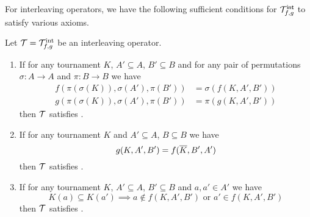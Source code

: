 For interleaving operators, we have the following sufficient conditions for
${\mathcal{T}_{f, g}^\mathsf{int}}$ to satisfy various axioms.

\begin{lemma}
   \label{tourn_result_interleaving_suffconditions}

   Let $\mathcal{T} = \mathcal{T}_{f,g}^{\text{int}}$ be an interleaving operator.

   \begin{enumerate}
       \item \label{tourn_item_int_lemma_anon}

        If for any tournament $K$, $A' \subseteq A$, $B' \subseteq B$ and for
        any pair of permutations $\sigma: A \to A$ and $\pi: B \to B$ we have
        \begin{align*}
            f(\pi(\sigma(K)), \sigma(A'), \pi(B')) &= \sigma(f(K, A', B')) \\
            g(\pi(\sigma(K)), \sigma(A'), \pi(B')) &= \pi(g(K, A', B'))
        \end{align*}
           then $\mathcal{T}$ satisfies \anon{}.

   \item \label{tourn_item_int_lemma_dual}

        If for any tournament $K$ and $A' \subseteq A$, $B \subseteq B$ we have
        \[ g(K, A', B') = f({\overline{K}}, B', A') \] then $\mathcal{T}$ satisfies
           \dualaxiom{}.

   \item \label{tourn_item_int_lemma_mon}

        If for any tournament $K$, $A' \subseteq A$, $B' \subseteq B$ and $a,
        a' \in A'$ we have
        \[
            K(a) \subseteq K(a')
            \implies
            a \not\in f(K, A', B') \text{ or } a' \in f(K, A', B')
        \]
           then $\mathcal{T}$ satisfies \mon{}.

    \end{enumerate}

\end{lemma}

